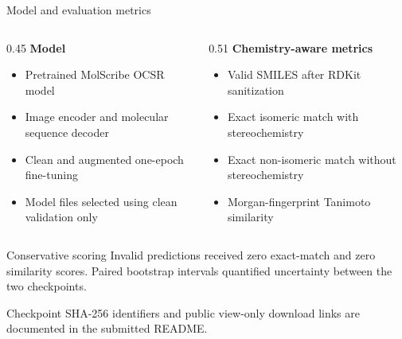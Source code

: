 \documentclass[aspectratio=169,10pt]{beamer}
\begin{document}
\begin{frame}{Model and evaluation metrics}
  \begin{columns}[T,onlytextwidth]
    \begin{column}{0.45\textwidth}
      \textbf{Model}
      \begin{itemize}
        \item Pretrained MolScribe OCSR model
        \item Image encoder and molecular sequence decoder
        \item Clean and augmented one-epoch fine-tuning
        \item Model files selected using clean validation only
      \end{itemize}
    \end{column}
    \begin{column}{0.51\textwidth}
      \textbf{Chemistry-aware metrics}
      \begin{itemize}
        \item Valid SMILES after RDKit sanitization
        \item Exact isomeric match with stereochemistry
        \item Exact non-isomeric match without stereochemistry
        \item Morgan-fingerprint Tanimoto similarity
      \end{itemize}
    \end{column}
  \end{columns}
  \vspace{0.25cm}
  \begin{block}{Conservative scoring}
    Invalid predictions received zero exact-match and zero similarity scores. Paired bootstrap intervals quantified uncertainty between the two checkpoints.
  \end{block}
  \vfill
  {\tiny Checkpoint SHA-256 identifiers and public view-only download links are documented in the submitted README.}
\end{frame}
\end{document}
